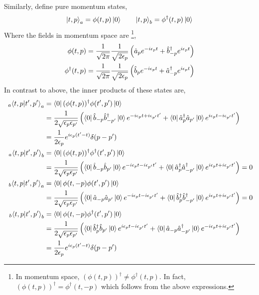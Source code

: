\documentclass[12pt]{extarticle}
\begin{document}
Similarly, define pure momentum states,
\[ \left| t, p \right>_a = \phi(t, p) \left| 0 \right> \quad \quad \left| t, p \right>_b = \phi^\dagger(t, p) \left| 0 \right> \]
Where the fields in momentum space are \footnote{In momentum space, $(\phi(t, p))^\dagger \neq \phi^\dagger(t, p)$. In fact, $(\phi(t, p))^\dagger = \phi^\dagger(t, -p)$ which follows from the above expressions. },
\begin{align*} 
\phi(t, p) & = \frac{1}{\sqrt{2\pi}} \frac{1}{\sqrt{2 \epsilon_p}} \left( \hat{a}_p e^{- i \epsilon_p t} + \hat{b}^\dagger_{-p} e^{ i \epsilon_p t} \right)
\\
\phi^\dagger(t, p) & = \frac{1}{\sqrt{2\pi}} \frac{1}{\sqrt{2 \epsilon_p}} \left( \hat{b}_p e^{- i \epsilon_p t} + \hat{a}^\dagger_{-p} e^{ i \epsilon_p t} \right)
\end{align*}
In contrast to above, the inner products of these states are,
\begin{align*}
~_a\!\left< t, p | t', p' \right>_a & = \left< 0 \right| (\phi(t, p))^\dagger \phi(t', p') \left| 0 \right> 
\\
& = \frac{1}{2 \sqrt{\epsilon_p \epsilon_{p'}}} \left(\left< 0 \right| \hat{b}_{-p} \hat{b}^\dagger_{-p'} \left| 0 \right> e^{- i \epsilon_{p} t + i \epsilon_{p'} t'} + \left< 0 \right| \hat{a}^\dagger_p \hat{a}_{p'} \left| 0 \right> e^{i \epsilon_{p} t - i \epsilon_{p'} t'} \right)
\\
& = \frac{1}{2 \epsilon_p} e^{i \epsilon_p ( t' - t)} \delta(p - p')
\\
~_a\!\left< t, p | t', p' \right>_b & = \left< 0 \right|  (\phi(t, p))^\dagger \phi^\dagger(t', p') \left| 0 \right> 
\\
& = \frac{1}{2 \sqrt{\epsilon_p \epsilon_{p'}}} \left(\left< 0 \right| \hat{b}_{-p} \hat{b}_{p'} \left| 0 \right> e^{- i \epsilon_{p} t - i \epsilon_{p'} t'} + \left< 0 \right| \hat{a}^\dagger_p \hat{a}^\dagger_{-p'} \left| 0 \right> e^{i \epsilon_{p} t + i \epsilon_{p'} t'} \right) = 0
\\
~_b\!\left< t, p | t', p' \right>_a & = \left< 0 \right| \phi(t, -p) \phi(t', p') \left| 0 \right> 
\\
& = \frac{1}{2 \sqrt{\epsilon_p \epsilon_{p'}}} \left(\left< 0 \right| \hat{a}_{-p} \hat{a}_{p'} \left| 0 \right> e^{- i \epsilon_{p} t - i \epsilon_{p'} t'} + \left< 0 \right| \hat{b}^\dagger_p \hat{b}^\dagger_{-p'} \left| 0 \right> e^{i \epsilon_{p} t + i \epsilon_{p'} t'} \right) = 0
\\
~_b\!\left< t, p | t', p' \right>_b & = \left< 0 \right| \phi(t, -p) \phi^\dagger(t', p') \left| 0 \right> 
\\
& = \frac{1}{2 \sqrt{\epsilon_p \epsilon_{p'}}} \left(\left< 0 \right| \hat{b}^\dagger_p \hat{b}_{p'} \left| 0 \right> e^{ i \epsilon_{p} t - i \epsilon_{p'} t'} + \left< 0 \right| \hat{a}_{-p} \hat{a}^\dagger_{-p'} \left| 0 \right> e^{ - i \epsilon_{p} t + i \epsilon_{p'} t'} \right)
\\
& = \frac{1}{2 \epsilon_p} e^{i \epsilon_p ( t' - t)} \delta(p - p')
\end{align*}
\end{document}
